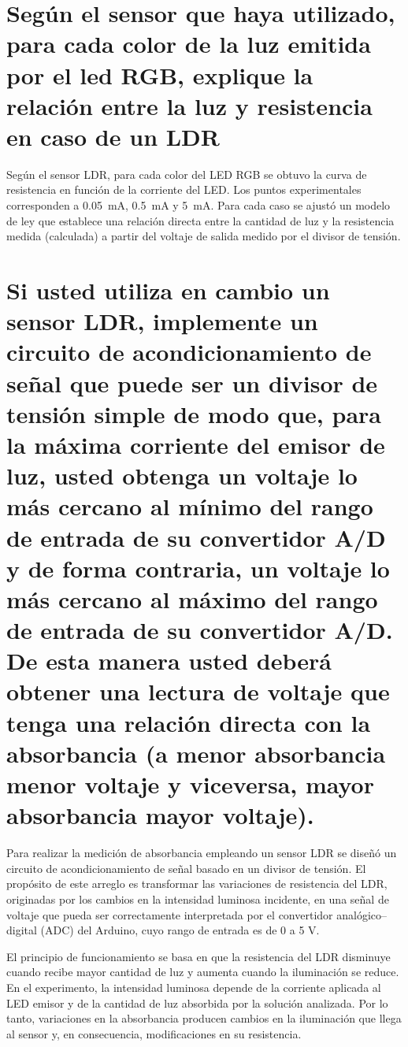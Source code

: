 \section{Según el sensor que haya utilizado, para cada color de la luz emitida por el led RGB, explique la relación entre la luz y resistencia en caso de un LDR}

Según el sensor LDR, para cada color del LED RGB se obtuvo la curva de resistencia en función de la corriente del LED. Los puntos experimentales corresponden a \SI{0,05}{\milli\ampere}, \SI{0,5}{\milli\ampere} y \SI{5}{\milli\ampere}. Para cada caso se ajustó un modelo de ley que establece una relación directa entre la cantidad de luz y la resistencia medida (calculada) a partir del voltaje de salida medido por el divisor de tensión.

\section{Si usted utiliza en cambio un sensor LDR, implemente un circuito de acondicionamiento de señal que puede ser un divisor de tensión simple de modo que, para la máxima corriente del emisor de
luz, usted obtenga un voltaje lo más cercano al mínimo del rango de entrada de su convertidor A/D y de forma contraria, un voltaje lo más cercano al máximo del rango de entrada de su convertidor A/D. De esta manera usted deberá obtener una lectura de voltaje que tenga una relación directa con la absorbancia (a menor absorbancia menor voltaje y viceversa, mayor absorbancia mayor voltaje).}

Para realizar la medición de absorbancia empleando un sensor LDR \cite{ldr_sensor} se diseñó un circuito de acondicionamiento de señal basado en un divisor de tensión. El propósito de este arreglo es transformar las variaciones de resistencia del LDR,
originadas por los cambios en la intensidad luminosa incidente, en una señal de
voltaje que pueda ser correctamente interpretada por el convertidor
analógico–digital (ADC) del Arduino, cuyo rango de entrada es de 0 a 5 V.

El principio de funcionamiento se basa en que la resistencia del LDR disminuye
cuando recibe mayor cantidad de luz y aumenta cuando la iluminación se reduce.
En el experimento, la intensidad luminosa depende de la corriente aplicada al
LED emisor y de la cantidad de luz absorbida por la solución analizada. Por lo
tanto, variaciones en la absorbancia producen cambios en la iluminación que
llega al sensor y, en consecuencia, modificaciones en su resistencia.

